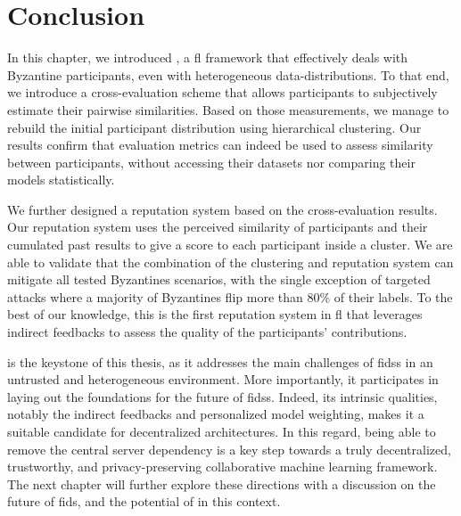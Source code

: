 \section{Conclusion\label{sec:radar.conclusion}}

In this chapter, we introduced \thecontrib, a \acrlong{fl} framework that effectively deals with Byzantine participants, even with heterogeneous data-distributions.
To that end, we introduce a cross-evaluation scheme that allows participants to subjectively estimate their pairwise similarities. 
Based on those measurements, we manage to rebuild the initial participant distribution using hierarchical clustering.
Our results confirm that evaluation metrics can indeed be used to assess similarity between participants, without accessing their datasets nor comparing their models statistically.

We further designed a reputation system based on the cross-evaluation results.
Our reputation system uses the perceived similarity of participants and their cumulated past results to give a score to each participant inside a cluster. 
We are able to validate that the combination of the clustering and reputation system can mitigate all tested Byzantines scenarios, with the single exception of targeted attacks where a majority of Byzantines flip more than 80\% of their labels. 
To the best of our knowledge, this is the first reputation system in \gls{fl} that leverages indirect feedbacks to assess the quality of the participants' contributions.

\thecontrib is the keystone of this thesis, as it addresses the main challenges of \glspl{fids} in an untrusted and heterogeneous environment.
More importantly, it participates in laying out the foundations for the future of \glspl{fids}.
Indeed, its intrinsic qualities, notably the indirect feedbacks and personalized model weighting, makes it a suitable candidate for decentralized architectures.
In this regard, being able to remove the central server dependency is a key step towards a truly decentralized, trustworthy, and privacy-preserving collaborative machine learning framework.
The next chapter will further explore these directions with a discussion on the future of \gls{fids}, and the potential of \thecontrib in this context.
